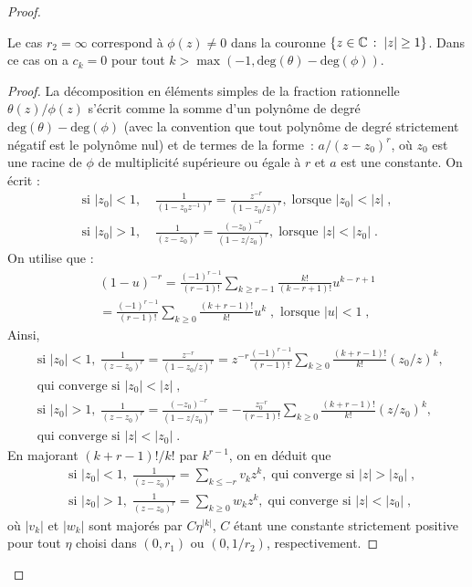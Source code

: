 \begin{proof}
\begin{lemma}
Le cas $r_2=\infty$ correspond \`a $\phi(z)\neq0$ dans la couronne $\left\{z \in \mathbb{C}\,:\; |z| \geq 1\right\}$. Dans ce cas on a $c_k=0$ pour tout $k>\max(-1,\mathrm{deg}(\theta)
- \mathrm{deg}(\phi))$.  
\end{lemma}
\begin{proof}\smartqed
  La d\'ecomposition en \'el\'ements simples de la fraction rationnelle
  $\theta(z)/\phi(z)$ s'\'ecrit comme la somme d'un polyn\^ome de degr\'e
  $\mathrm{deg}(\theta) - \mathrm{deg}(\phi)$ (avec la convention que tout
  polyn\^ome de degr\'e strictement n\'egatif est le polyn\^ome nul) et de termes de la forme~:
  $a/(z-z_0)^r$, o\`u $z_0$ est une racine de $\phi$ de multiplicit\'e sup\'erieure
  ou \'egale \`a $r$ et $a$ est une constante.  On \'ecrit :
\begin{align*}
\textrm{si }|z_0|<1,& \;
\frac{1}{(1-z_0 z^{-1})^r}=\frac{z^{-r}}{(1-z_0/z)^r},\;
\textrm{lorsque }|z_0|<|z|\;,\\
\textrm{si }|z_0|>1,& \;
\frac{1}{(z-z_0)^r}=\frac{(-z_0)^{-r}}{(1-z/z_0)^r},\;
\textrm{lorsque }|z|<|z_0|\;.
\end{align*}
On utilise que :
\begin{multline*}
(1-u)^{-r}=\frac{(-1)^{r-1}}{(r-1)!}\sum_{k\geq r-1}\frac{k!}{(k-r+1)!}
u^{k-r+1}\\
=\frac{(-1)^{r-1}}{(r-1)!}\sum_{k\geq 0}\frac{(k+r-1)!}{k!}
u^{k}\;,\textrm{ lorsque }|u|<1\;,
\end{multline*}
Ainsi,
\begin{align*}
&\textrm{si }|z_0|<1, \;
\frac{1}{(z-z_0)^r}=\frac{z^{-r}}{(1-z_0/z)^r}
=z^{-r}\frac{(-1)^{r-1}}{(r-1)!}\sum_{k\geq 0}\frac{(k+r-1)!}{k!}(z_0/z)^k,\; \\
&\textrm{qui converge si }|z_0|<|z|\;,\\
&\textrm{si }|z_0|>1, \;
\frac{1}{(z-z_0)^r}=\frac{(-z_0)^{-r}}{(1-z/z_0)^r}
=-\frac{z_0^{-r}}{(r-1)!}\sum_{k\geq 0}\frac{(k+r-1)!}{k!}
(z/z_0)^k,\; \\
&\textrm{qui converge si }|z|<|z_0|\;.
\end{align*}
En majorant $(k+r-1)!/k!$ par $k^{r-1}$, on en d\'eduit  que
\begin{align*}
&\textrm{si }|z_0|<1, \;
\frac{1}{(z-z_0)^r}=\sum_{k\leq -r} v_k z^k,\; \textrm{qui converge si }|z|>|z_0|\;,\\
&\textrm{si }|z_0|>1, \;
\frac{1}{(z-z_0)^r}=\sum_{k\geq 0} w_k z^k,\;\textrm{qui converge si }|z|<|z_0|\;,
\end{align*}
o\`u $|v_k|$ et $|w_k|$ sont major\'es par $C \eta^{|k|}$, $C$ \'etant une constante
strictement positive pour tout $\eta$ choisi dans
$(0,r_1)$ ou $(0,1/r_2)$, respectivement.


\end{proof}
\end{proof}

